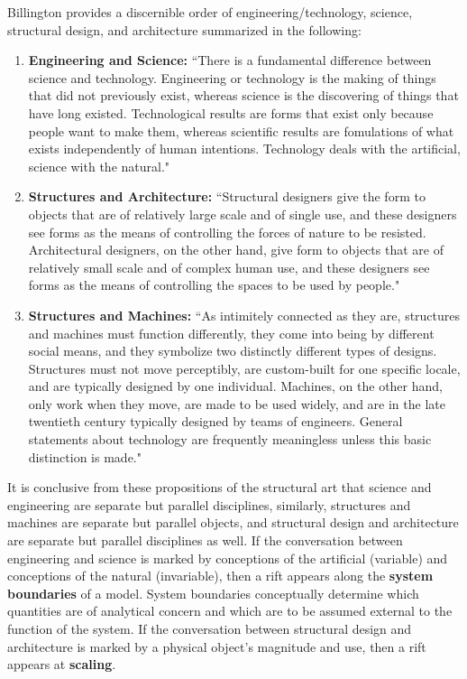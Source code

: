 Billington provides a discernible order of engineering/technology, science, structural design, and architecture summarized in the following:

\begin{enumerate}
  \item [] \textbf{Engineering and Science:} ``There is a fundamental difference between science and technology. Engineering or technology is the making of things that did not previously exist, whereas science is the discovering of things that have long existed. Technological results are forms that exist only because people want to make them, whereas scientific results are fomulations of what exists independently of human intentions. Technology deals with the artificial, science with the natural."\cite[p9]{TOWERANDBRIDGE}

  \item [] \textbf{Structures and Architecture:} ``Structural designers give the form to objects that are of relatively large scale and of single use, and these designers see forms as the means of controlling the forces of nature to be resisted. Architectural designers, on the other hand, give form to objects that are of relatively small scale and of complex human use, and these designers see forms as the means of controlling the spaces to be used by people." \cite[14]{TOWERANDBRIDGE}

  \item[] \textbf{Structures and Machines:} ``As intimitely connected as they are, structures and machines must function differently, they come into being by different social means, and they symbolize two distinctly different types of designs. Structures must not move perceptibly, are custom-built for one specific locale, and are typically designed by one individual. Machines, on the other hand, only work when they move, are made to be used widely, and are in the late twentieth century typically designed by teams of engineers. General statements about technology are frequently meaningless unless this basic distinction is made."\cite[p13]{TOWERANDBRIDGE}


\end{enumerate}

It is conclusive from these propositions of the structural art that science and engineering are separate but parallel disciplines, similarly, structures and machines are separate but parallel objects, and structural design and architecture are separate but parallel disciplines as well. If the conversation between engineering and science is marked by conceptions of the artificial (variable) and conceptions of the natural (invariable), then a rift appears along the \textbf{system boundaries} of a model. System boundaries conceptually determine which quantities are of analytical concern and which are to be assumed external to the function of the system. If the conversation between structural design and architecture is marked by a physical object's magnitude and use, then a rift appears at \textbf{scaling}.

